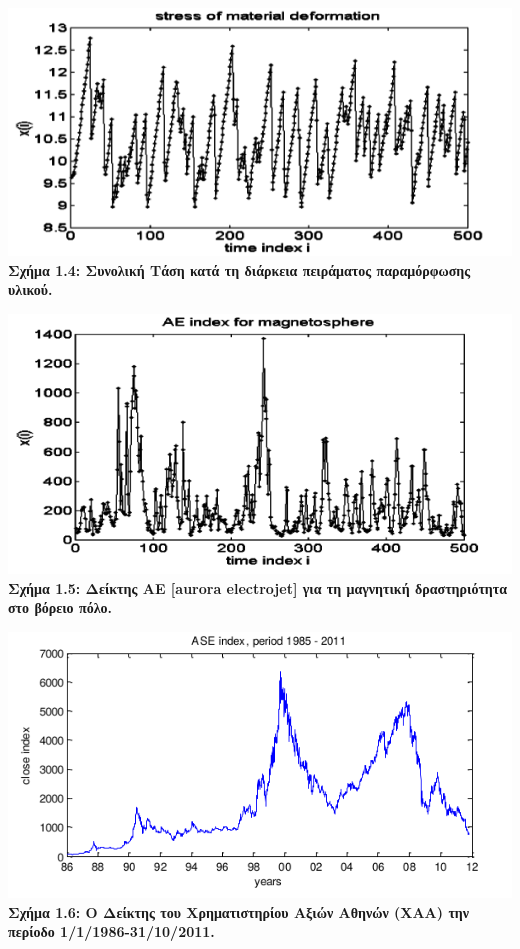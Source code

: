\begin{center}
\includegraphics[scale=0.5]{graf5_3.png}\\
\textbf{Σχήμα 1.4: Συνολική Τάση κατά τη διάρκεια πειράματος παραμόρφωσης υλικού.}
\end{center}
\begin{center}
\includegraphics[scale=0.5]{graf5_5.png}\\
\textbf{Σχήμα 1.5: Δείκτης ΑΕ [aurora electrojet] για τη μαγνητική δραστηριότητα στο βόρειο πόλο. }
\end{center}
\begin{center}
\includegraphics[scale=0.5]{graf5_6.png}\\
\textbf{Σχήμα 1.6: Ο Δείκτης του Χρηματιστηρίου Αξιών Αθηνών (ΧΑΑ) την περίοδο 1/1/1986-31/10/2011. }
\end{center}

